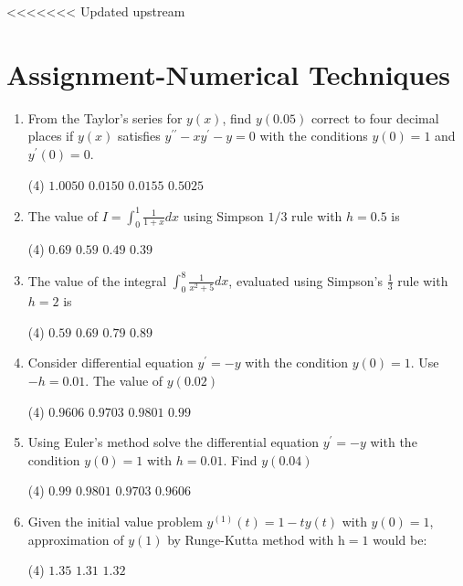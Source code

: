 <<<<<<< Updated upstream
\chapter{Assignment-Numerical Techniques}
\begin{enumerate}
	\item From the Taylor's series for $y(x)$, find $y(0.05)$ correct to four decimal places if $y(x)$ satisfies $y^{\prime \prime}-x y^{\prime}-y=0$ with the conditions $y(0)=1$ and $y^{\prime}(0)=0$.
 \begin{tasks}(4)
	\task[\textbf{a.}]$1.0050$
	\task[\textbf{b.}]$0.0150$
	\task[\textbf{c.}] $0.0155$
	\task[\textbf{d.}]  $0.5025$
\end{tasks}	
	\item The value of $I=\int_{0}^{1} \frac{1}{1+x} d x$ using Simpson $1 / 3$ rule with $h=0.5$ is
	 \begin{tasks}(4)
		\task[\textbf{a.}]$0.69$
		\task[\textbf{b.}]$0.59$
		\task[\textbf{c.}]$0.49$
		\task[\textbf{d.}]  $0.39$
	\end{tasks}
	\item The value of the integral $\int_{0}^{8} \frac{1}{x^{2}+5} d x$, evaluated using Simpson's $\frac{1}{3}$ rule with $h=2$ is
	 \begin{tasks}(4)
		\task[\textbf{a.}]$0.59$
		\task[\textbf{b.}]$0.69$
		\task[\textbf{c.}] $0.79$
		\task[\textbf{d.}] $0.89$
	\end{tasks}
	\item Consider differential equation $y^{\prime}=-y$ with the condition $y(0)=1$. Use $-h=0.01$. The value of $y(0.02)$
	 \begin{tasks}(4)
		\task[\textbf{a.}]$0.9606$
		\task[\textbf{b.}] $0.9703$
		\task[\textbf{c.}]$0.9801$
		\task[\textbf{d.}] $0.99$
	\end{tasks}
	\item Using Euler's method solve the differential equation $y^{\prime}=-y$ with the condition $y(0)=1$ with $h=0.01$. Find $y(0.04)$
	 \begin{tasks}(4)
		\task[\textbf{a.}]$0.99$
		\task[\textbf{b.}] $0.9801$
		\task[\textbf{c.}]$0.9703$
		\task[\textbf{d.}] $0.9606$
	\end{tasks}
	\item Given the initial value problem $y^{(1)}(t)=1-t y(t)$ with $y(0)=1$, approximation of $y(1)$ by Runge-Kutta method with $\mathrm{h}=1$ would be:
	 \begin{tasks}(4)
		\task[\textbf{a.}]$1.35$
		\task[\textbf{b.}]$1.31$
		\task[\textbf{c.}]$1.32$

\end{tasks}
\end{enumerate}
